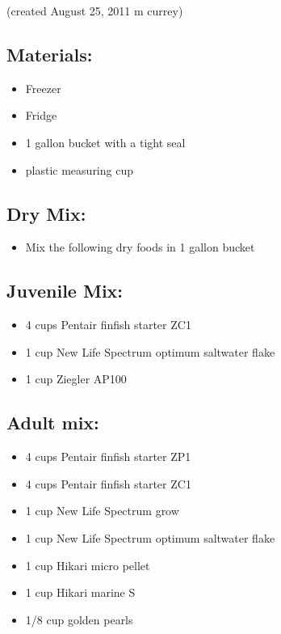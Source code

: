 \documentclass[
]{book}
\providecommand{\tightlist}{%
  \setlength{\itemsep}{0pt}\setlength{\parskip}{0pt}}
\begin{document}
(created August 25, 2011 m currey)

\hypertarget{materials-1}{%
\subsection{Materials:}\label{materials-1}}

\begin{itemize}
\tightlist
\item
  Freezer
\item
  Fridge
\item
  1 gallon bucket with a tight seal
\item
  plastic measuring cup
\end{itemize}

\hypertarget{dry-mix}{%
\subsection{Dry Mix:}\label{dry-mix}}

\begin{itemize}
\tightlist
\item
  Mix the following dry foods in 1 gallon bucket
\end{itemize}

\hypertarget{juvenile-mix}{%
\subsection{Juvenile Mix:}\label{juvenile-mix}}

\begin{itemize}
\tightlist
\item
  4 cups Pentair finfish starter ZC1
\item
  1 cup New Life Spectrum optimum saltwater flake
\item
  1 cup Ziegler AP100
\end{itemize}

\hypertarget{adult-mix}{%
\subsection{Adult mix:}\label{adult-mix}}

\begin{itemize}
\tightlist
\item
  4 cups Pentair finfish starter ZP1
\item
  4 cups Pentair finfish starter ZC1
\item
  1 cup New Life Spectrum grow
\item
  1 cup New Life Spectrum optimum saltwater flake
\item
  1 cup Hikari micro pellet
\item
  1 cup Hikari marine S
\item
  1/8 cup golden pearls
\end{itemize}
\end{document}
